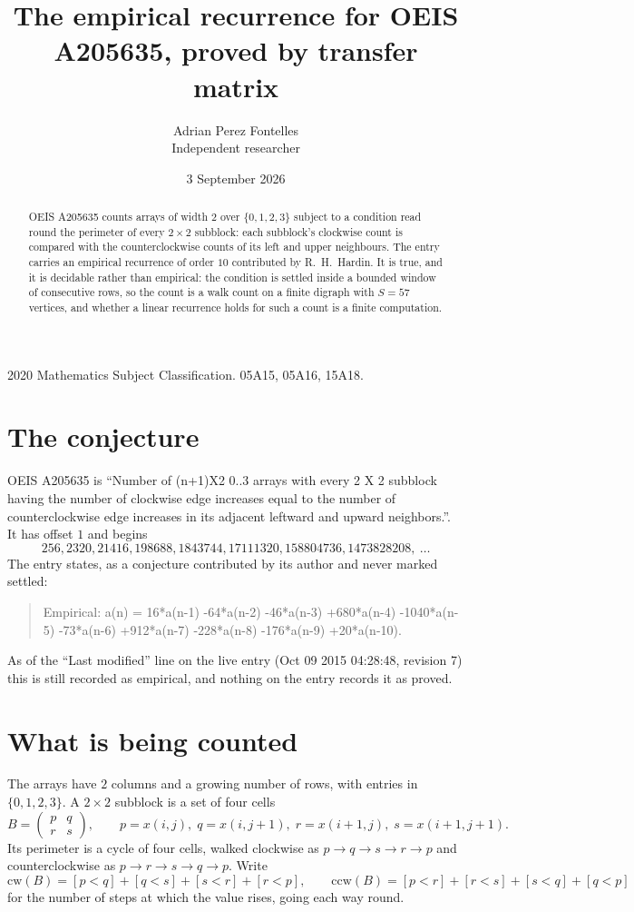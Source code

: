\documentclass[11pt,a4paper]{article}
\title{The empirical recurrence for OEIS A205635, proved by transfer matrix}
\author{Adrian Perez Fontelles\\ \small Independent researcher}
\date{3 September 2026}
\theoremstyle{plain}
\theoremstyle{definition}
\begin{document}
\maketitle

\begin{abstract}
OEIS A205635 counts arrays of width $2$ over $\{0,1,2,3\}$ subject to a condition read round the
perimeter of every $2\times2$ subblock: each subblock's clockwise count is compared with the counterclockwise counts of its left and upper neighbours. The entry carries an empirical recurrence of
order $10$ contributed by R.~H.~Hardin. It is true, and it is decidable rather than
empirical: the condition is settled inside a bounded window of consecutive rows, so the
count is a walk count on a finite digraph with $S=57$ vertices, and whether a linear
recurrence holds for such a count is a finite computation.
\end{abstract}

\noindent\small 2020 Mathematics Subject Classification. 05A15, 05A16, 15A18.\normalsize

\section{The conjecture}

OEIS A205635 is ``Number of (n+1)X2 0..3 arrays with every 2 X 2 subblock having the number of clockwise edge increases equal to the number of counterclockwise edge increases in its adjacent leftward and upward neighbors.''. It has offset $1$ and begins
\[
256, 2320, 21416, 198688, 1843744, 17111320, 158804736, 1473828208,\ \dots
\]
The entry states, as a conjecture contributed by its author and never marked settled:
\begin{quote}
Empirical: a(n) = 16*a(n-1) -64*a(n-2) -46*a(n-3) +680*a(n-4) -1040*a(n-5) -73*a(n-6) +912*a(n-7) -228*a(n-8) -176*a(n-9) +20*a(n-10).
\end{quote}
As of the ``Last modified'' line on the live entry (Oct 09 2015 04:28:48, revision 7) this is still
recorded as empirical, and nothing on the entry records it as proved.

\section{What is being counted}

The arrays have $2$ columns and a growing number of rows, with entries in $\{0,1,2,3\}$. A
$2\times2$ subblock is a set of four cells
\[
B=\begin{pmatrix} p & q \\ r & s \end{pmatrix},
\qquad p=x(i,j),\; q=x(i,j+1),\; r=x(i+1,j),\; s=x(i+1,j+1).
\]
Its perimeter is a cycle of four cells, walked clockwise as $p\to q\to s\to r\to p$ and
counterclockwise as $p\to r\to s\to q\to p$. Write
\[
\mathrm{cw}(B)=[p<q]+[q<s]+[s<r]+[r<p],\qquad
\mathrm{ccw}(B)=[p<r]+[r<s]+[s<q]+[q<p]
\]
for the number of steps at which the value rises, going each way round.
\end{document}
